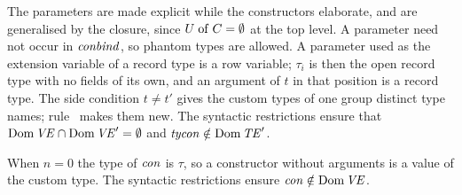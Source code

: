 \begin{rulecomments}
 The parameters are made explicit while the
constructors elaborate, and are generalised by the closure, since $U \mathrel{\mathrm{of}} C =
\emptyset$ at the top level. A parameter need not occur in $\mathit{conbind}$, so
phantom types are allowed. A parameter used as the extension variable of a
record type is a row variable; $\tau_i$ is then the open record type with no
fields of its own, and an argument of $t$ in that position is a record type.
The side condition $t \neq t'$ gives the custom types of one group distinct
type names; rule~ makes them new. The syntactic
restrictions ensure that $\mathrm{Dom}\,\mathit{VE} \cap \mathrm{Dom}\,\mathit{VE}' = \emptyset$ and $\mathit{tycon} \notin
\mathrm{Dom}\,\mathit{TE}'$.
\end{rulecomments}



\begin{rulecomments}
 When $n = 0$ the type of $\mathit{con}$ is $\tau$, so a
constructor without arguments is a value of the custom type. The syntactic
restrictions ensure $\mathit{con} \notin \mathrm{Dom}\,\mathit{VE}$.
\end{rulecomments}





